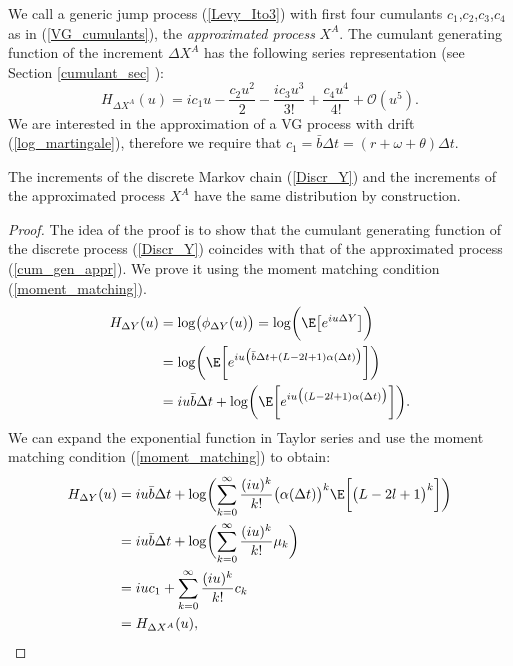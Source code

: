 We call a generic jump process (\ref{Levy_Ito3}) with first four cumulants $c_1$,$c_2$,$c_3$,$c_4$ as in (\ref{VG_cumulants}), 
the \emph{approximated process} $X^A$. 
The cumulant generating function of the increment $\Delta X^A$ has the following series representation (see Section \ref{cumulant_sec} ):
\begin{equation}\label{cum_gen_appr}
 H_{\Delta X^{A}}(u) = ic_1 u -\frac{c_2u^2}{2} -\frac{ic_3u^3}{3!} + \frac{c_4u^4}{4!} + \mathcal{O}(u^5).
\end{equation}
We are interested in the approximation of a VG process with drift (\ref{log_martingale}), therefore we require that $c_1 = \bar b \Delta t = (r+\omega+\theta)\Delta t$. 
\begin{Theorem}
The increments of the discrete Markov chain (\ref{Discr_Y}) and the increments of the approximated process $X^A$ have the same distribution by construction.
\end{Theorem}
\begin{proof}
The idea of the proof is to show that the cumulant generating function of the discrete process (\ref{Discr_Y}) 
coincides with that of the approximated process (\ref{cum_gen_appr}). We prove it using the moment
matching condition (\ref{moment_matching}).
\begin{align}
H_{\Delta Y}(u) &= \log \bigl( \phi_{\Delta Y}(u)  \bigr) = \log \biggl( \E \bigl[ e^{iu \Delta Y} \bigr] \biggr) \\ \nonumber
                &= \log \biggl( \E \biggl[ e^{iu \bigl( \bar b \Delta t + (L-2l+1) \alpha(\Delta t) \bigr) } \biggr] \biggr) \\ \nonumber
		&= iu \bar b \Delta t + \log \biggl( \E \biggl[ e^{iu \bigl(  (L-2l+1) \alpha(\Delta t) \bigr) } \biggr] \biggr).
\end{align}
We can expand the exponential function in Taylor series and use the moment matching condition (\ref{moment_matching}) to obtain:
\begin{align}
H_{\Delta Y}(u) &= iu \bar b \Delta t + \log \biggl( \sum_{k=0}^{\infty} \frac{(iu)^k}{k!} 
\bigl(\alpha(\Delta t)\bigr)^k \E \biggl[ \bigl( L-2l+1  \bigr)^k \biggr] \biggr) \\ \nonumber
                &= iu \bar b \Delta t + \log \biggl( \sum_{k=0}^{\infty} \frac{(iu)^k}{k!} \mu_k \biggr) \\ \nonumber
                &= iu c_1 + \sum_{k=0}^{\infty} \frac{(iu)^k}{k!} c_k \\ \nonumber 
                &= H_{\Delta X^{A}}(u),
\end{align}
\end{proof}
